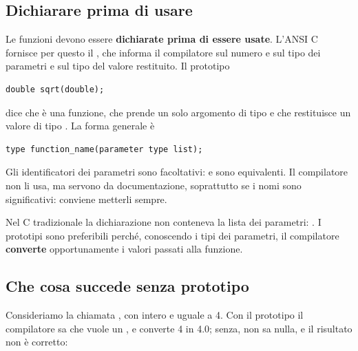 \subsection{Dichiarare prima di usare}

Le funzioni devono essere \textbf{dichiarate prima di essere usate}. L'ANSI C
fornisce per questo il , che informa il compilatore sul
numero e sul tipo dei parametri e sul tipo del valore restituito. Il
prototipo

\begin{lstlisting}[style=c]
double sqrt(double);
\end{lstlisting}

dice che  è una funzione, che prende un solo argomento di tipo
 e che restituisce un valore di tipo . La forma
generale è

\begin{lstlisting}[style=c]
type function_name(parameter type list);
\end{lstlisting}

Gli identificatori dei parametri sono facoltativi:  e  sono equivalenti. Il compilatore non li
usa, ma servono da documentazione, soprattutto se i nomi sono significativi:
conviene metterli sempre.

Nel C tradizionale la dichiarazione non conteneva la lista dei parametri:
. I prototipi sono preferibili perché, conoscendo i
tipi dei parametri, il compilatore \textbf{converte} opportunamente i valori
passati alla funzione.

\subsection{Che cosa succede senza prototipo}

Consideriamo la chiamata , con  intero e uguale a 4.
Con il prototipo il compilatore sa che  vuole un , e
converte 4 in 4.0; senza, non sa nulla, e il risultato non è corretto:

